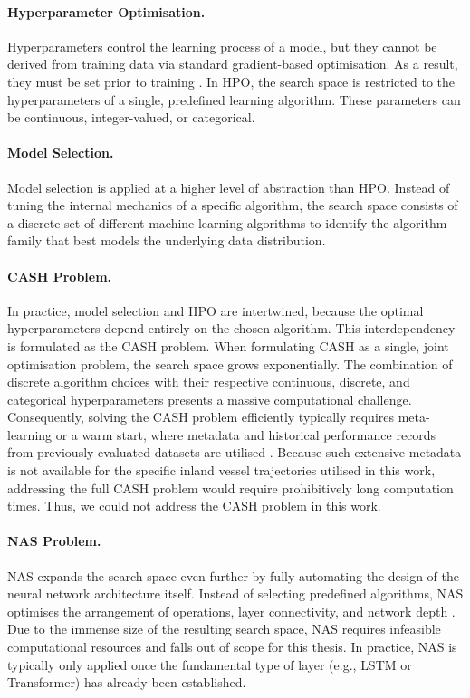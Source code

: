 \paragraph{Hyperparameter Optimisation.}
\label{subsubsection:HPO}
Hyperparameters control the learning process of a model, but they cannot be derived from training data via standard gradient-based optimisation.
As a result, they must be set prior to training \parencite{hutter2019automated}.
In \ac{HPO}, the search space is restricted to the hyperparameters of a single, predefined learning algorithm.
These parameters can be continuous, integer-valued, or categorical.

\paragraph{Model Selection.}
Model selection is applied at a higher level of abstraction than \ac{HPO}.
Instead of tuning the internal mechanics of a specific algorithm, the search space consists of a discrete set of different machine learning algorithms to identify the algorithm family that best models the underlying data distribution.




\paragraph{CASH Problem.}
In practice, model selection and \ac{HPO} are intertwined, because the optimal hyperparameters depend entirely on the chosen algorithm.
This interdependency is formulated as the \ac{CASH} problem.
When formulating \ac{CASH} as a single, joint optimisation problem, the search space grows exponentially.
The combination of discrete algorithm choices with their respective continuous, discrete, and categorical hyperparameters presents a massive computational challenge.
Consequently, solving the \ac{CASH} problem efficiently typically requires meta-learning or a warm start, where metadata and historical performance records from previously evaluated datasets are utilised \parencite{AutoMLHoos}.
Because such extensive metadata is not available for the specific inland vessel trajectories utilised in this work, addressing the full \ac{CASH} problem would require prohibitively long computation times. %
Thus, we could not address the \ac{CASH} problem in this work.


\paragraph{NAS Problem.} 
\acf{NAS} expands the search space even further by fully automating the design of the neural network architecture itself. Instead of selecting predefined algorithms, \ac{NAS} optimises the arrangement of operations, layer connectivity, and network depth \parencite{AutoMLHoos}. Due to the immense size of the resulting search space, \ac{NAS} requires infeasible
computational resources and falls out of scope for this thesis. In practice, \ac{NAS} is typically only applied once the fundamental type of layer (e.g., \ac{LSTM} or Transformer) has already been established.


